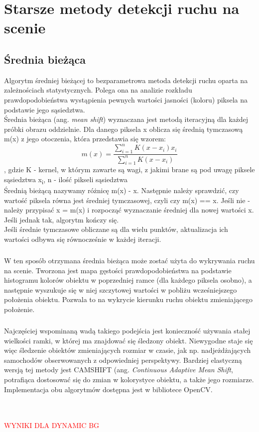 \chapter{Starsze metody detekcji ruchu na scenie}
\label{cha:metodyStare}
\section{Średnia bieżąca}
Algorytm średniej bieżącej to bezparametrowa metoda detekcji ruchu oparta na zależnościach statystycznych. Polega ona na analizie rozkładu prawdopodobieństwa wystąpienia pewnych wartości jasności (koloru) piksela na podstawie jego sąsiedztwa.\\
\nocite{kheng2011mean}
Średnia bieżąca (ang. \textit{mean shift}) wyznaczana jest metodą iteracyjną dla każdej próbki obrazu oddzielnie. Dla danego piksela x oblicza się średnią tymczasową m(x) z jego otoczenia, która przedstawia się wzorem:
\begin{equation}
m(x) = 
\frac{\sum_{i=1}^{n}K(x-x_{i})x_{i}}{\sum_{i=1}^{n}K(x-x_{i})}
\end{equation}
, gdzie K - kernel, w którym zawarte są wagi, z jakimi brane są pod uwagę piksele sąsiedztwa x\textsubscript{i}, n - ilość pikseli sąsiedztwa \\
Średnią bieżącą nazywamy różnicę m(x) - x.
Następnie należy sprawdzić, czy wartość piksela równa jest średniej tymczasowej, czyli czy m(x) == x. Jeśli nie - należy przypisać x = m(x) i rozpocząć wyznaczanie średniej dla nowej wartości x. Jeśli jednak tak, algorytm kończy się.\\
Jeśli średnie tymczasowe obliczane są dla wielu punktów, aktualizacja ich wartości odbywa się równocześnie w każdej iteracji.
\paragraph{}
W ten sposób otrzymana średnia bieżąca może zostać użyta do wykrywania ruchu na scenie. Tworzona jest mapa gęstości prawdopodobieństwa na podstawie histogramu kolorów obiektu w poprzedniej ramce (dla każdego piksela osobno), a następnie wyszukuje się w niej szczytowej wartości w pobliżu wcześniejszego położenia obiektu. Pozwala to na wykrycie kierunku ruchu obiektu zmieniającego położenie.
\paragraph{}
Najczęściej wspominaną wadą takiego podejścia jest konieczność używania stałej wielkości ramki, w której ma znajdować się śledzony obiekt. Niewygodne staje się więc śledzenie obiektów zmieniających rozmiar w czasie, jak np. nadjeżdżających samochodów obserwowanych z odpowiedniej perspektywy. Bardziej elastyczną wersją tej metody jest CAMSHIFT (ang. \textit{Continuous Adaptive Mean Shift}, potrafiąca dostosować się do zmian w kolorystyce obiektu, a także jego rozmiarze. Implementacja obu algorytmów dostępna jest w bibliotece OpenCV.\\ \\ \\
\begin{LARGE}
\textcolor{red}{WYNIKI DLA DYNAMIC BG}
\end{LARGE}

